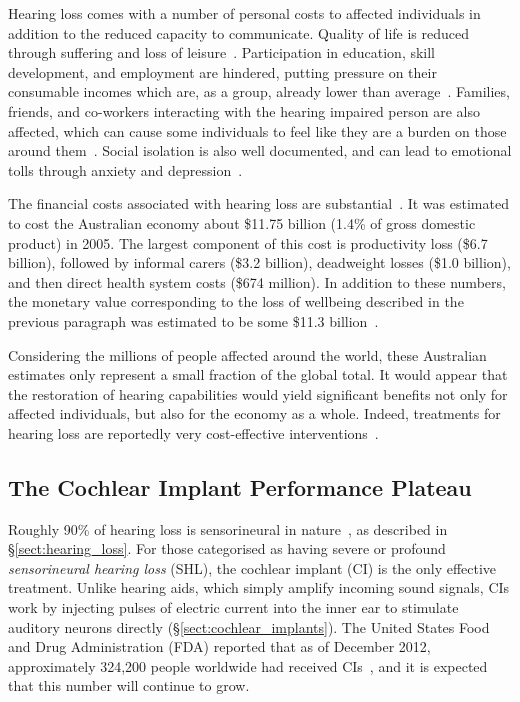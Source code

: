Hearing loss comes with a number of personal costs to affected individuals in
addition to the reduced capacity to communicate. Quality of life is reduced
through suffering and loss of leisure~\cite{economics2006}. Participation in
education, skill development, and employment are hindered, putting pressure on
their consumable incomes which are, as a group, already lower than
average~\cite{economics2006}. Families, friends, and co-workers interacting with
the hearing impaired person are also affected, which can cause some individuals
to feel like they are a burden on those around them~\cite{mo2005}. Social
isolation is also well documented, and can lead to emotional tolls through
anxiety and depression~\cite{mo2005}.

The financial costs associated with hearing loss are
substantial~\cite{economics2006}. It was estimated to cost the Australian
economy about \$11.75 billion (1.4\% of gross domestic product) in 2005. The
largest component of this cost is productivity loss (\$6.7 billion), followed by
informal carers (\$3.2 billion), deadweight losses (\$1.0 billion), and then
direct health system costs (\$674 million). In addition to these numbers, the
monetary value corresponding to the loss of wellbeing described in the previous
paragraph was estimated to be some \$11.3 billion~\cite{economics2006}.

Considering the millions of people affected around the world, these Australian
estimates only represent a small fraction of the global total. It would appear
that the restoration of hearing capabilities would yield significant benefits
not only for affected individuals, but also for the economy as a whole. Indeed,
treatments for hearing loss are reportedly very cost-effective
interventions~\cite{economics2006}.

\subsection{The Cochlear Implant Performance Plateau}

Roughly 90\% of hearing loss is sensorineural in nature~\cite{wilson1998}, as
described in \S\ref{sect:hearing_loss}. For those categorised as having severe
or profound \emph{sensorineural hearing loss} (SHL), the cochlear implant (CI)
is the only effective treatment. Unlike hearing aids, which simply amplify
incoming sound signals, CIs work by injecting pulses of electric current into
the inner ear to stimulate auditory neurons directly
(\S\ref{sect:cochlear_implants}). The United States Food and Drug Administration
(FDA) reported that as of December 2012, approximately 324,200 people worldwide
had received CIs~\cite{nidcd2014}, and it is expected that this number will
continue to grow.

